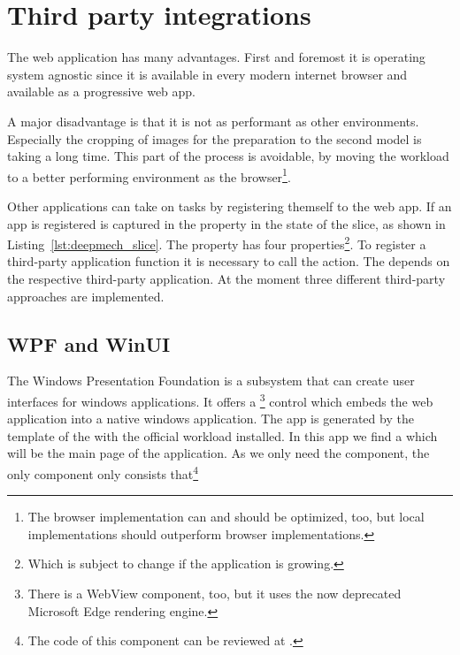 \section{Third party integrations}

The web application has many advantages.
First and foremost it is operating system agnostic since it is available in every modern internet browser and available as a progressive web app. %

A major disadvantage is that it is not as performant as other environments.
Especially the cropping of images for the preparation to the second model is taking a long time.
This part of the process is avoidable, by moving the workload to a better performing environment as the browser\footnote{The browser implementation can and should be optimized, too, but local implementations should outperform browser implementations. }. %

Other applications can take on tasks by registering themself to the web app.
If an app is registered is captured in the  property in the state of the  slice, as shown in Listing~\ref{lst:deepmech_slice}.
The  property has four properties\footnote{Which is subject to change if the application is growing.}.
To register a third-party application function it is necessary to call the  action.
The  depends on the respective third-party application.
At the moment three different third-party approaches are implemented.

\subsection{WPF and WinUI}

The Windows Presentation Foundation is a subsystem that can create user interfaces for windows applications.
It offers a \footnote{There is a WebView component, too, but it uses the now deprecated Microsoft Edge rendering engine.} control which embeds the web application into a native windows application. %
The app is generated by the template  of the  with the official  workload installed.
In this app we find a  which will be the main page of the application.
As we only need the  component, the only component  only consists that\footnote{The code of this component can be reviewed at .}

